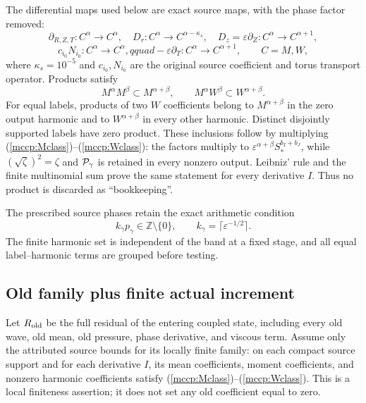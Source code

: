 The differential maps used below are exact source maps, with the phase
factor removed:
\begin{equation}\label{mccp:derivative_maps}
 \partial_{R,Z,T}:C^\alpha\to C^\alpha,\quad
 D_r:C^\alpha\to C^{\alpha-\kappa_s},\quad
 D_z=\varepsilon\partial_Z:C^\alpha\to C^{\alpha+1},
\end{equation}
\[
 c_{i_0}N_{i_0}:C^\alpha\to C^\alpha,qquad
 -\varepsilon\partial_T:C^\alpha\to C^{\alpha+1},
 \qquad C=M,W,
\]
where $\kappa_s=10^{-5}$ and $c_{i_0},N_{i_0}$ are the original source
coefficient and torus transport operator. Products satisfy
\begin{equation}\label{mccp:product_closure}
 M^\alpha M^\beta\subset M^{\alpha+\beta},\qquad
 M^\alpha W^\beta\subset W^{\alpha+\beta}.
\end{equation}
For equal labels, products of two $W$ coefficients belong to
$M^{\alpha+\beta}$ in the zero output harmonic and to
$W^{\alpha+\beta}$ in every other harmonic. Distinct disjointly
supported labels have zero product. These inclusions follow by multiplying
(\ref{mccp:Mclass})--(\ref{mccp:Wclass}): the factors multiply to
$\varepsilon^{\alpha+\beta}S_*^{b_I+b_J}$, while
$(\sqrt\zeta)^2=\zeta$ and ${\cal P}_\gamma$ is retained in every
nonzero output. Leibniz' rule and the finite multinomial sum prove the
same statement for every derivative $I$. Thus no product is discarded as
``bookkeeping''.

The prescribed source phases retain the exact arithmetic condition
\begin{equation}\label{mccp:phase_arithmetic}
 k_\gamma p_\gamma\in\mathbb Z\setminus\{0\},\qquad
 k_\gamma=\lceil\varepsilon^{-1/2}\rceil .
\end{equation}
The finite harmonic set is independent of the band at a fixed stage, and
all equal label--harmonic terms are grouped before testing.

\subsection{Old family plus finite actual increment}

Let $R_{\rm old}$ be the full residual of the entering coupled state,
including every old wave, old mean, old pressure, phase derivative, and
viscous term. Assume only the attributed source bounds for its locally
finite family: on each compact source support and for each derivative
$I$, its mean coefficients, moment coefficients, and nonzero harmonic
coefficients satisfy (\ref{mccp:Mclass})--(\ref{mccp:Wclass}). This is a
local finiteness assertion; it does not set any old coefficient equal to
zero.

